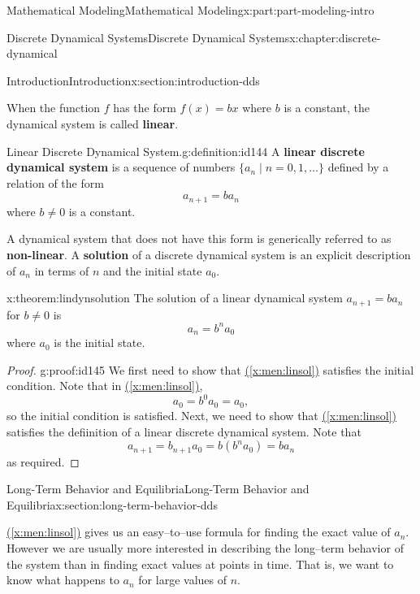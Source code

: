 \documentclass[oneside,10pt,]{book}
\newcommand{\xreffont}{\relax}
\newcommand{\terminology}[1]{\textbf{#1}}
\numberwithin{equation}{section}
\begin{document}
\begin{partptx}{Mathematical Modeling}{}{Mathematical Modeling}{}{}{x:part:part-modeling-intro}
\begin{chapterptx}{Discrete Dynamical Systems}{}{Discrete Dynamical Systems}{}{}{x:chapter:discrete-dynamical}
\begin{sectionptx}{Introduction}{}{Introduction}{}{}{x:section:introduction-dds}
\par
When the function \(f\) has the form \(f(x) = bx\) where \(b\) is a constant, the dynamical system is called \terminology{linear}.%
\begin{definition}{Linear Discrete Dynamical System.}{g:definition:id144}%
A \terminology{linear discrete dynamical system} is a sequence of numbers \(\{a_n\mid n=0, 1, \dots\}\) defined by a relation of the form%
%
\begin{equation*}
a_{n+1} = ba_n
\end{equation*}
where \(b\ne 0\) is a constant.%
\end{definition}
A dynamical system that does not have this form is generically referred to as \terminology{non-linear}. A \terminology{solution} of a discrete dynamical system is an explicit description of \(a_n\) in terms of \(n\) and the initial state \(a_0\).%
\begin{theorem}{}{}{x:theorem:lindynsolution}%
The solution of a linear dynamical system \(a_{n+1}=b a_n\) for \(b\ne 0\) is%
%
\begin{equation}
a_n = b^n a_0\label{x:men:linsol}
\end{equation}
where \(a_0\) is the initial state.%
\end{theorem}
\begin{proof}{}{g:proof:id145}
We first need to show that \hyperref[x:men:linsol]{({\xreffont\ref{x:men:linsol}})} satisfies the initial condition. Note that in \hyperref[x:men:linsol]{({\xreffont\ref{x:men:linsol}})},%
%
\begin{equation*}
a_0=b^0a_0=a_0,
\end{equation*}
so the initial condition is satisfied. Next, we need to show that \hyperref[x:men:linsol]{({\xreffont\ref{x:men:linsol}})} satisfies the defiinition of a linear discrete dynamical system. Note that%
%
\begin{equation*}
a_{n+1}=b_{n+1}a_0 = b(b^na_0) = ba_n
\end{equation*}
as required.%
\end{proof}
\end{sectionptx}
%
%
\typeout{************************************************}
\typeout{************************************************}
%
\begin{sectionptx}{Long-Term Behavior and Equilibria}{}{Long-Term Behavior and Equilibria}{}{}{x:section:long-term-behavior-dds}
\begin{introduction}{}%
\hyperref[x:men:linsol]{({\xreffont\ref{x:men:linsol}})} gives us an easy–to–use formula for finding the exact value of \(a_n\). However we are usually more interested in describing the long–term behavior of the system than in finding exact values at points in time. That is, we want to know what happens to \(a_n\) for large values of \(n\).%

\end{introduction}
\end{sectionptx}
\end{chapterptx}
\end{partptx}
\end{document}
